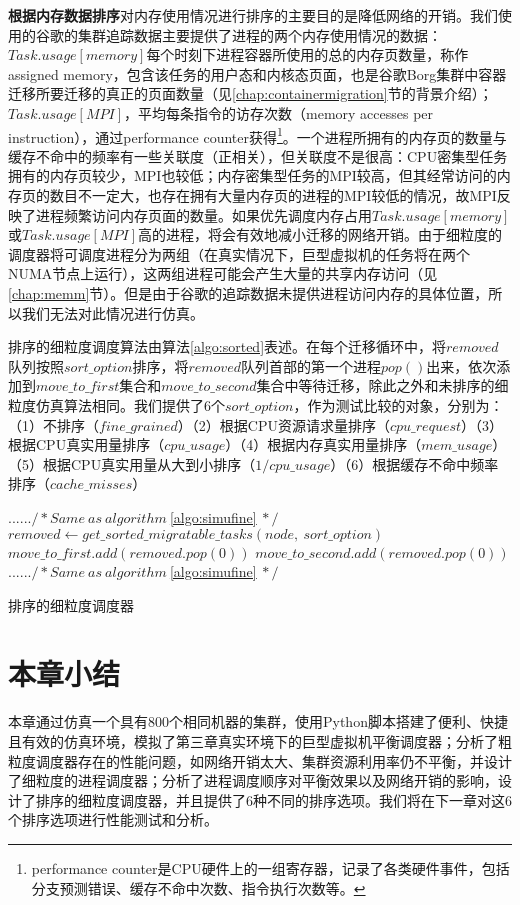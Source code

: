 \noindent\textbf{根据内存数据排序}\quad 对内存使用情况进行排序的主要目的是降低网络的开销。我们使用的谷歌的集群追踪数据主要提供了进程的两个内存使用情况的数据：$Task.usage[memory]$每个时刻下进程容器所使用的总的内存页数量，称作assigned memory，包含该任务的用户态和内核态页面，也是谷歌Borg集群中容器迁移所要迁移的真正的页面数量（见\ref{chap:containermigration}节的背景介绍）；$Task.usage[MPI]$，平均每条指令的访存次数（memory accesses per instruction），通过performance counter获得\footnote{performance counter\cite{perf}是CPU硬件上的一组寄存器，记录了各类硬件事件，包括分支预测错误、缓存不命中次数、指令执行次数等。}。一个进程所拥有的内存页的数量与缓存不命中的频率有一些关联度（正相关），但关联度不是很高：CPU密集型任务拥有的内存页较少，MPI也较低；内存密集型任务的MPI较高，但其经常访问的内存页的数目不一定大，也存在拥有大量内存页的进程的MPI较低的情况，故MPI反映了进程频繁访问内存页面的数量。如果优先调度内存占用$Task.usage[memory]$或$Task.usage[MPI]$高的进程，将会有效地减小迁移的网络开销。由于细粒度的调度器将可调度进程分为两组（在真实情况下，巨型虚拟机的任务将在两个NUMA节点上运行），这两组进程可能会产生大量的共享内存访问（见\ref{chap:memm}节）。但是由于谷歌的追踪数据未提供进程访问内存的具体位置，所以我们无法对此情况进行仿真。

排序的细粒度调度算法由算法\ref{algo:sorted}表述。在每个迁移循环中，将$removed$队列按照$sort\_option$排序，将$removed$队列首部的第一个进程$pop()$出来，依次添加到$move\_to\_first$集合和$move\_to\_second$集合中等待迁移，除此之外和未排序的细粒度仿真算法相同。我们提供了6个$sort\_option$，作为测试比较的对象，分别为：（1）不排序（$fine\_grained$）（2）根据CPU资源请求量排序（$cpu\_request$）（3）根据CPU真实用量排序（$cpu\_usage$）（4）根据内存真实用量排序（$mem\_usage$）（5）根据CPU真实用量从大到小排序（$1/cpu\_usage$）（6）根据缓存不命中频率排序（$cache\_misses$）

\begin{algorithm}[h]
\begin{algorithmic}[1]
\State $...... /* Same \ as\  algorithm\ $\ref{algo:simufine}$\ */$
\State $removed \gets get\_sorted\_migratable\_tasks(node,\ sort\_option)$
\State $move\_to\_first.add(removed.pop(0))$
\EndWhile
{}
\State $move\_to\_second.add(removed.pop(0))$
\EndWhile
\State $...... /* Same \ as\  algorithm\ $\ref{algo:simufine}$\ */$
\end{algorithmic}
\caption{排序的细粒度调度器}
\label{algo:sorted}
\end{algorithm}

\section{本章小结}
本章通过仿真一个具有800个相同机器的集群，使用Python脚本搭建了便利、快捷且有效的仿真环境，模拟了第三章真实环境下的巨型虚拟机平衡调度器；分析了粗粒度调度器存在的性能问题，如网络开销太大、集群资源利用率仍不平衡，并设计了细粒度的进程调度器；分析了进程调度顺序对平衡效果以及网络开销的影响，设计了排序的细粒度调度器，并且提供了6种不同的排序选项。我们将在下一章对这6个排序选项进行性能测试和分析。